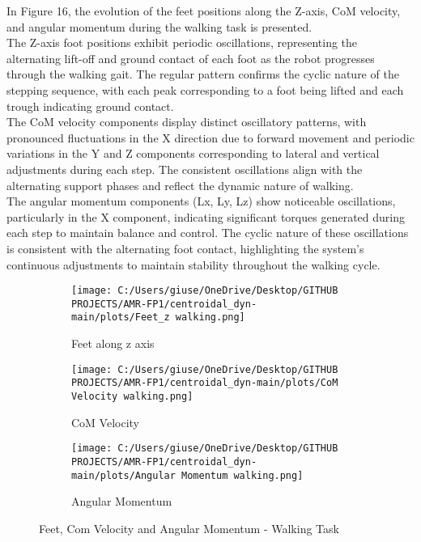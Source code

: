 \documentclass[main.tex]{subfiles}
\begin{document}
In Figure 16, the evolution of the feet positions along the Z-axis, CoM velocity, and angular momentum during the walking task is presented.\\
The Z-axis foot positions exhibit periodic oscillations, representing the alternating lift-off and ground contact of each foot as the robot progresses through the walking gait. The regular pattern confirms the cyclic nature of the stepping sequence, with each peak corresponding to a foot being lifted and each trough indicating ground contact.\\
The CoM velocity components display distinct oscillatory patterns, with pronounced fluctuations in the X direction due to forward movement and periodic variations in the Y and Z components corresponding to lateral and vertical adjustments during each step. The consistent oscillations align with the alternating support phases and reflect the dynamic nature of walking.\\
The angular momentum components (Lx, Ly, Lz) show noticeable oscillations, particularly in the X component, indicating significant torques generated during each step to maintain balance and control. The cyclic nature of these oscillations is consistent with the alternating foot contact, highlighting the system’s continuous adjustments to maintain stability throughout the walking cycle.
\begin{figure}[htbp]
    \centering
    \begin{subfigure}[b]{0.32\textwidth}
        \centering
        \texttt{[image: C:/Users/giuse/OneDrive/Desktop/GITHUB PROJECTS/AMR-FP1/centroidal\_dyn-main/plots/Feet\_z walking.png]}
        \caption{Feet along z axis}
        \label{fig:sub1}
    \end{subfigure}
    \hfill
    \begin{subfigure}[b]{0.32\textwidth}
        \centering
        \texttt{[image: C:/Users/giuse/OneDrive/Desktop/GITHUB PROJECTS/AMR-FP1/centroidal\_dyn-main/plots/CoM Velocity walking.png]}
        \caption{CoM Velocity}
        \label{fig:sub2}
    \end{subfigure}
    \hfill
    \begin{subfigure}[b]{0.32\textwidth}
        \centering
        \texttt{[image: C:/Users/giuse/OneDrive/Desktop/GITHUB PROJECTS/AMR-FP1/centroidal\_dyn-main/plots/Angular Momentum walking.png]}
        \caption{Angular Momentum}
        \label{fig:sub3}
    \end{subfigure}
    \caption{Feet, Com Velocity and Angular Momentum - Walking Task}
    \label{fig:threeimages}
\end{figure}
\end{document}
